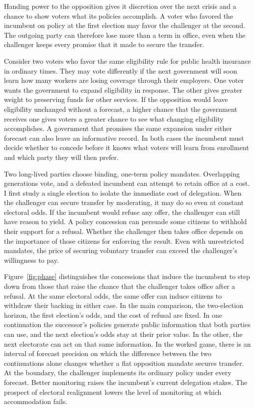 \documentclass[11pt,letterpaper]{article}
\begin{document}
Handing power to the opposition gives it discretion over the next crisis and a chance to show voters what its policies accomplish. A voter who favored the incumbent on policy at the first election may favor the challenger at the second. The outgoing party can therefore lose more than a term in office, even when the challenger keeps every promise that it made to secure the transfer.

Consider two voters who favor the same eligibility rule for public health insurance in ordinary times. They may vote differently if the next government will soon learn how many workers are losing coverage through their employers. One voter wants the government to expand eligibility in response. The other gives greater weight to preserving funds for other services. If the opposition would leave eligibility unchanged without a forecast, a higher chance that the government receives one gives voters a greater chance to see what changing eligibility accomplishes. A government that promises the same expansion under either forecast can also leave an informative record. In both cases the incumbent must decide whether to concede before it knows what voters will learn from enrollment and which party they will then prefer.

Two long-lived parties choose binding, one-term policy mandates. Overlapping generations vote, and a defeated incumbent can attempt to retain office at a cost. I first study a single election to isolate the immediate cost of delegation. When the challenger can secure transfer by moderating, it may do so even at constant electoral odds. If the incumbent would refuse any offer, the challenger can still have reason to yield. A policy concession can persuade some citizens to withhold their support for a refusal. Whether the challenger then takes office depends on the importance of those citizens for enforcing the result. Even with unrestricted mandates, the price of securing voluntary transfer can exceed the challenger's willingness to pay.

Figure~\ref{fig:phase} distinguishes the concessions that induce the incumbent to step down from those that raise the chance that the challenger takes office after a refusal. At the same electoral odds, the same offer can induce citizens to withdraw their backing in either case. In the main comparison, the two-election horizon, the first election's odds, and the cost of refusal are fixed. In one continuation the successor's policies generate public information that both parties can use, and the next election's odds stay at their prior value. In the other, the next electorate can act on that same information. In the worked game, there is an interval of forecast precision on which the difference between the two continuations alone changes whether a flat opposition mandate secures transfer. At the boundary, the challenger implements its ordinary policy under every forecast. Better monitoring raises the incumbent's current delegation stakes. The prospect of electoral realignment lowers the level of monitoring at which accommodation fails.
\end{document}
